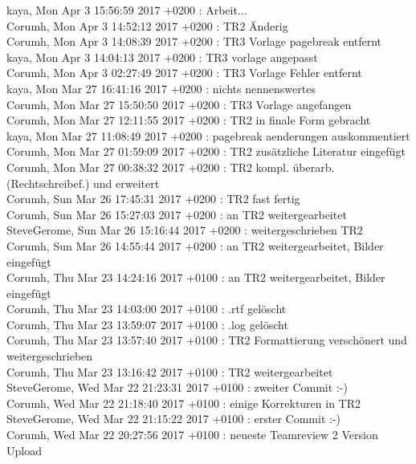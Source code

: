 kaya, Mon Apr 3 15:56:59 2017 +0200 : Arbeit...\\
Corumh, Mon Apr 3 14:52:12 2017 +0200 : TR2 Änderig\\
Corumh, Mon Apr 3 14:08:39 2017 +0200 : TR3 Vorlage pagebreak entfernt\\
kaya, Mon Apr 3 14:04:13 2017 +0200 : TR3 vorlage angepasst\\
Corumh, Mon Apr 3 02:27:49 2017 +0200 : TR3 Vorlage Fehler entfernt\\
kaya, Mon Mar 27 16:41:16 2017 +0200 : nichts nennenswertes\\
Corumh, Mon Mar 27 15:50:50 2017 +0200 : TR3 Vorlage angefangen\\
Corumh, Mon Mar 27 12:11:55 2017 +0200 : TR2 in finale Form gebracht\\
kaya, Mon Mar 27 11:08:49 2017 +0200 : pagebreak aenderungen auskommentiert\\
Corumh, Mon Mar 27 01:59:09 2017 +0200 : TR2 zusätzliche Literatur eingefügt\\
Corumh, Mon Mar 27 00:38:32 2017 +0200 : TR2 kompl. überarb. (Rechtschreibef.) und erweitert\\
Corumh, Sun Mar 26 17:45:31 2017 +0200 : TR2 fast fertig\\
Corumh, Sun Mar 26 15:27:03 2017 +0200 : an TR2 weitergearbeitet\\
SteveGerome, Sun Mar 26 15:16:44 2017 +0200 : weitergeschrieben TR2\\
Corumh, Sun Mar 26 14:55:44 2017 +0200 : an TR2 weitergearbeitet, Bilder eingefügt\\
Corumh, Thu Mar 23 14:24:16 2017 +0100 : an TR2 weitergearbeitet, Bilder eingefügt\\
Corumh, Thu Mar 23 14:03:00 2017 +0100 : .rtf gelöscht\\
Corumh, Thu Mar 23 13:59:07 2017 +0100 : .log gelöscht\\
Corumh, Thu Mar 23 13:57:40 2017 +0100 : TR2 Formattierung verschönert und weitergeschrieben\\
Corumh, Thu Mar 23 13:16:42 2017 +0100 : TR2 weitergearbeitet\\
SteveGerome, Wed Mar 22 21:23:31 2017 +0100 : zweiter Commit :-)\\
Corumh, Wed Mar 22 21:18:40 2017 +0100 : einige Korrekturen in TR2\\
SteveGerome, Wed Mar 22 21:15:22 2017 +0100 : erster Commit :-)\\
Corumh, Wed Mar 22 20:27:56 2017 +0100 : neueste Teamreview 2 Version Upload\\
